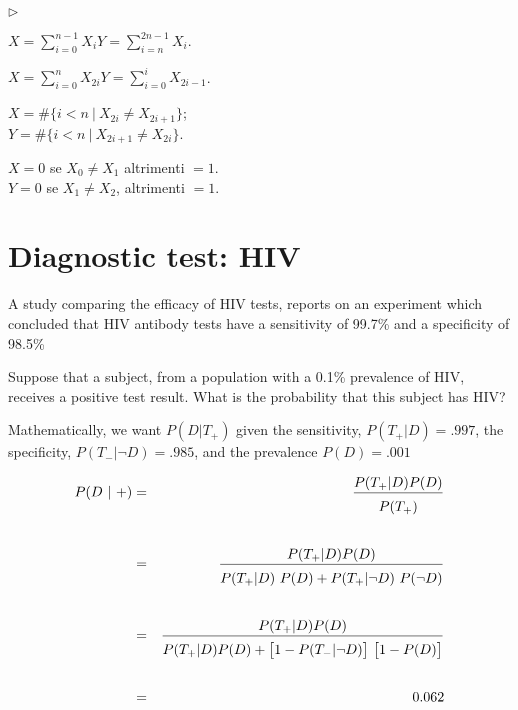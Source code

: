 \documentclass[10pt,openany]{book}
\newcommand{\mylabel}[1]{{\footnotesize\textsf{#1}}\hfill}
\renewenvironment{itemize}
  {\begin{list}{$\triangleright$}{%
   \setlength{\parskip}{0mm}
   \setlength{\topsep}{.2\baselineskip}
   \setlength{\rightmargin}{0mm}
   \setlength{\listparindent}{0mm}
   \setlength{\itemindent}{0mm}
   \setlength{\labelwidth}{3ex}
   \setlength{\itemsep}{.4\baselineskip}
   \setlength{\parsep}{0mm}
   \setlength{\partopsep}{0mm}
   \setlength{\labelsep}{1ex}
   \setlength{\leftmargin}{\labelwidth+\labelsep}
   \let\makelabel\mylabel}}{%
   \end{list}\vspace*{-1.3mm}}
\theoremstyle{mio}
\theoremstyle{liscio}
\begin{document}
\begin{itemize}
\item[1.] $\displaystyle X=\sum_{i=0}^{n-1}X_i$\qquad $\displaystyle Y=\sum_{i=n}^{2n-1}X_i$.


\item[2.] $\displaystyle X=\sum_{i=0}^{n}X_{2i}$\qquad $\displaystyle Y=\sum_{i=0}^{i} X_{2i-1}$.\bigskip

\item[3.] $X= \#\big\{i<n\ |\ X_{2i}\neq X_{2i+1}\big\}$;\\
$Y= \#\big\{i<n\ |\ X_{2i+1}\neq X_{2i}\big\}$.\bigskip

\item[4.] $X=0$ se $X_0\neq X_1$ altrimenti $=1$. \\
$Y=0$ se $X_1\neq X_2$, altrimenti $=1$.

\end{itemize}



\clearpage\section{Diagnostic test: HIV}
\label{HIV_test}

A study comparing the efficacy of HIV tests, reports on an
experiment which concluded that HIV antibody tests have a
{\color{brown}sensitivity of 99.7\%} and a {\color{brown}specificity of 98.5\%}

Suppose that a subject, from a population with a {\color{brown} 0.1\% prevalence}
of HIV, receives a positive test result. What is the probability
that this subject has HIV?

Mathematically, we want $P(D | T_+)$ given the sensitivity, {\color{brown}$P(T_+
| D) = .997$}, the specificity, {\color{brown}$P(T_- | \neg D) =.985$}, and the
prevalence {\color{brown}$P(D) = .001$}

\begin{eqnarray*}
P(D ~|~ +)& = &\frac{P(T_+|D)P(D)}{P(T_+)\vphantom{\Big[}}\\ \\
& = &\frac{P(T_+|D)P(D)}{P(T_+|D)\ P(D) + P(T_+|\neg D)\ P(\neg D)\vphantom{\Big[}}\\ \\
& = & \frac{P(T_+|D)P(D)}{P(T_+|D)P(D) + \big[1-P(T_-|\neg D)\big]\ \big[1 - P(D)\big]\vphantom{\Big[}} \\ \\
& = & 0.062
\end{eqnarray*}
\end{document}
